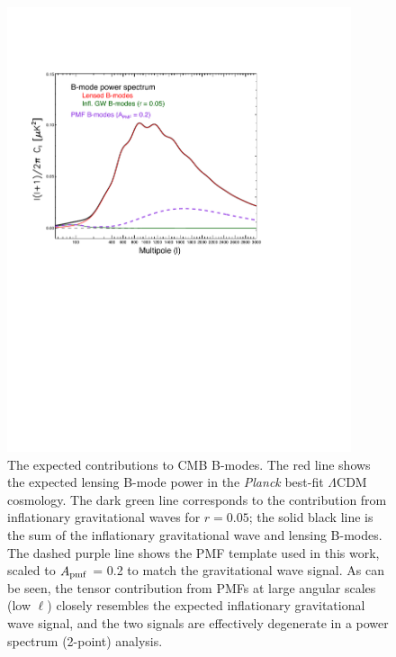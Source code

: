 \documentclass[apj]{emulateapj}
\newcommand{\apmf}{\ensuremath{A_{\rm pmf}}}
\newcommand{\lcdm}{\ensuremath{\Lambda}CDM}
\newcommand{\planck}{{\sl Planck}}
\begin{document}
\begin{figure}[htb]\centering
\includegraphics[width=0.9\textwidth,clip,trim={1.5cm 12.cm 5cm 4cm}]{pmf_templates.pdf}
  \caption[CMB polarization from PMFs]{
  The expected contributions to CMB B-modes. 
  The red line shows the expected lensing B-mode power in the \planck{} best-fit \lcdm{} cosmology. 
  The dark green line corresponds to the contribution from inflationary gravitational waves for $r=0.05$; the solid black line is the sum of the inflationary gravitational wave and lensing B-modes. 
  The dashed purple line shows the PMF template used in this work, scaled to \apmf{} = 0.2 to match the gravitational wave signal. 
  As can be seen, the tensor contribution from PMFs at large angular scales (low $\ell$) closely resembles the expected inflationary gravitational wave signal, and the two signals are effectively degenerate in a power spectrum (2-point) analysis.
      \label{fig:pmf-bb}
  }
\end{figure}
 
\end{document}

